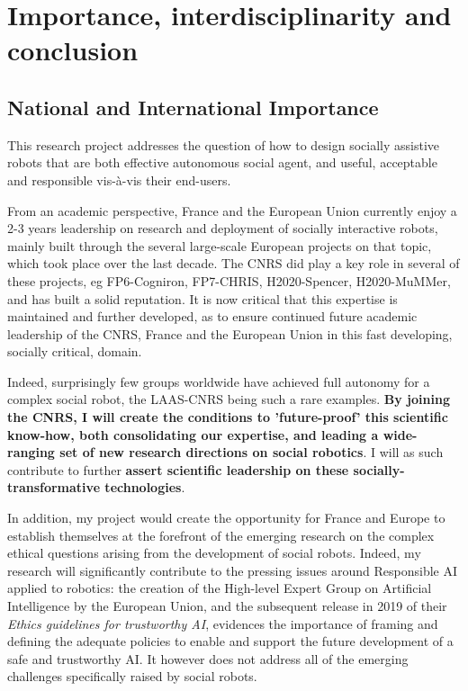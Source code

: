 
\vspace{3em}
\section{Importance, interdisciplinarity and conclusion}



\subsection{National and International Importance}

This research project addresses the question of how to design socially
assistive robots that are both effective autonomous social agent, and useful,
acceptable and responsible vis-à-vis their end-users.

From an academic perspective, France and the European Union currently enjoy a
2-3 years leadership on research and deployment of socially interactive robots,
mainly built through the several large-scale European projects on that topic,
which took place over the last decade. The CNRS did
play a key role in several of these projects, eg FP6-Cogniron, FP7-CHRIS,
H2020-Spencer, H2020-MuMMer, and has built a solid reputation. It is now
critical that this expertise is maintained and further developed, as to ensure
continued future academic leadership of the CNRS, France and the European Union
in this fast developing, socially critical, domain.

Indeed, surprisingly few groups worldwide have achieved full autonomy for a complex
social robot, the LAAS-CNRS being such a rare examples. \textbf{By joining the CNRS, I
will create the conditions to 'future-proof' this scientific know-how, both
consolidating our expertise, and leading a wide-ranging set of new research
directions on social robotics}. I will as such contribute to further
\textbf{assert scientific leadership on these socially-transformative technologies}.

In addition, my project would create the opportunity for France and Europe to
establish themselves at the forefront of the emerging research on the complex
ethical questions arising from the development of social robots. Indeed, my
research will significantly contribute to the pressing issues around Responsible
AI applied to robotics: the creation of the High-level Expert Group on
Artificial Intelligence by the European Union, and the subsequent release in
2019 of their \emph{Ethics guidelines for trustworthy AI}, evidences the
importance of framing and defining the adequate policies to enable and support
the future development of a safe and trustworthy AI. It however does not address
all of the emerging challenges specifically raised by social robots.

